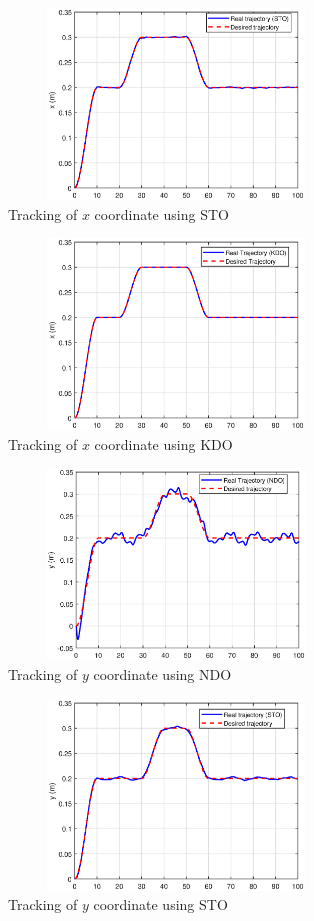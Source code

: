 \documentclass[letterpaper%
, twoside%
, 12pt%
,memoire%
, english%
,creativecommons,hyperref%
]{thETS}
\begin{document}
\begin{figure}[H]
\centering
\includegraphics[width=3.5in,height=2in]{Figures/results/tracking/x_trac_dis_m1_sto.eps}
\caption{Tracking of $x$ coordinate using STO}
\label{x_trac_dis_m1_sto}
\end{figure}

\begin{figure}[H]
\centering
\includegraphics[width=3.5in,height=2in]{Figures/results/tracking/x_trac_dis_m1_kdo.eps}
\caption{Tracking of $x$ coordinate using KDO}
\label{x_trac_dis_m1_kdo}
\end{figure}

\begin{figure}[H]
\centering
\includegraphics[width=3.5in,height=2in]{Figures/results/tracking/y_trac_dis_m1_ndo.eps}
\caption{Tracking of $y$ coordinate using NDO}
\label{y_trac_dis_m1_ndo}
\end{figure}

\begin{figure}[H]
\centering
\includegraphics[width=3.5in,height=2in]{Figures/results/tracking/y_trac_dis_m1_sto.eps}
\caption{Tracking of $y$ coordinate using STO}
\label{y_trac_dis_m1_sto}
\end{figure}
\end{document}

